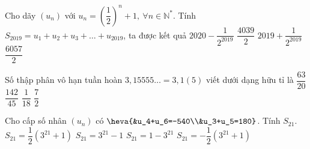 \begin{ex}%
	Cho dãy $\left(u_n\right)$ với $u_n =  \left(\dfrac{1}{2}\right)^n + 1,\ \forall n \in \mathbb{N}^*$. Tính $S_{2019} = u_1 + u_2 + u_3 + \ldots + u_{2019}$, ta được kết quả
	\choice 
		{\True  $2020 - \dfrac{1}{2^{2019}}$}
		 {$\dfrac{4039}{2}$}
		{$2019 + \dfrac{1}{2^{2019}}$} 
		 {$\dfrac{6057}{2}$}
\end{ex}

\begin{ex}%
	Số thập phân vô hạn tuần hoàn $3{,}15555\ldots=3{,}1(5)$ viết dưới dạng hữu tỉ  là
	 \choice
		 {$\dfrac{63}{20}$}
		 {\True$\dfrac{142}{45}$}
		{$\dfrac{1}{18}$} 
		{$\dfrac{7}{2}$} 
	\loigiai{\[3{,}15555\ldots=3{,}1(5)=3{,}1+5\left(\dfrac{1}{10^2}+\dfrac{1}{10^3}+\cdots\right)=3{,}1+5\cdot\dfrac{\dfrac{1}{10^2}}{1-\dfrac{1}{10}}=\dfrac{142}{45}. 
		 \]
	} 
\end{ex}

\begin{ex}%
	Cho cấp số nhân $\left(u_n\right)$ có  $\heva{&u_4+u_6=-540\\&u_3+u_5=180}$. Tính $S_{21}$.
	 \choice
		{\True  $S_{21}=\dfrac{1}{2}\left(3^{21}+1\right)$}
		{$S_{21}=3^{21}-1$} 
		 {$S_{21}=1-3^{21}$}
		{$S_{21}=-\dfrac{1}{2}\left(3^{21}+1\right)$} 
\end{ex}


